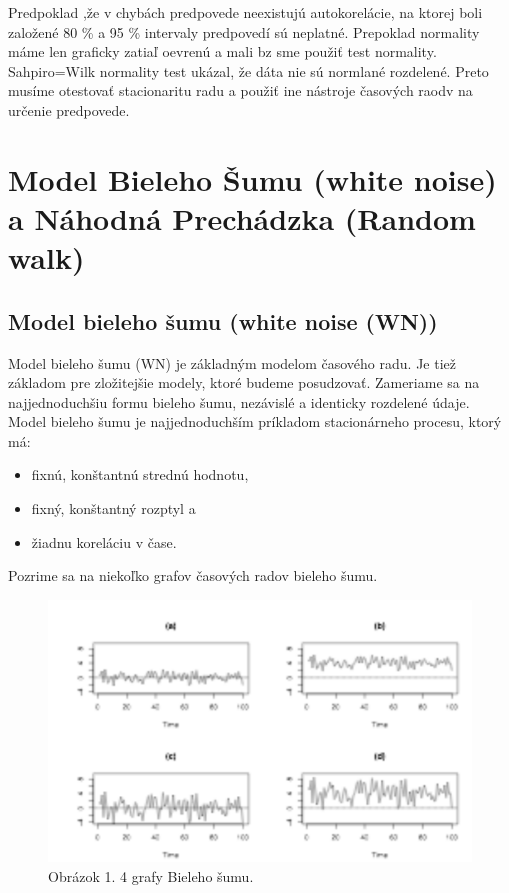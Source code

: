 \documentclass[
  letterpaper,
  DIV=11,
  numbers=noendperiod]{scrreprt}
\providecommand{\tightlist}{%
  \setlength{\itemsep}{0pt}\setlength{\parskip}{0pt}}\usepackage{longtable,booktabs,array}
\begin{document}
Predpoklad ,že v chybách predpovede neexistujú autokorelácie, na ktorej
boli založené 80 \% a 95 \% intervaly predpovedí sú neplatné. Prepoklad
normality máme len graficky zatiaľ oevrenú a mali bz sme použiť test
normality. Sahpiro=Wilk normality test ukázal, že dáta nie sú normlané
rozdelené. Preto musíme otestovať stacionaritu radu a použiť ine
nástroje časových raodv na určenie predpovede.

\part{Model Bieleho Šumu (white noise) a Náhodná Prechádzka (Random
walk)}

\chapter{Model bieleho šumu (white noise
(WN))}\label{model-bieleho-ux161umu-white-noise-wn}

Model bieleho šumu (WN) je základným modelom časového radu. Je tiež
základom pre zložitejšie modely, ktoré budeme posudzovať. Zameriame sa
na najjednoduchšiu formu bieleho šumu, nezávislé a identicky rozdelené
údaje. Model bieleho šumu je najjednoduchším príkladom stacionárneho
procesu, ktorý má:

\begin{itemize}
\tightlist
\item
  fixnú, konštantnú strednú hodnotu,
\item
  fixný, konštantný rozptyl a
\item
  žiadnu koreláciu v čase.
\end{itemize}

Pozrime sa na niekoľko grafov časových radov bieleho šumu.

\begin{figure}[H]

{\centering \includegraphics{wn1.png}

}

\caption{Obrázok 1. 4 grafy Bieleho šumu.}

\end{figure}%
\end{document}
